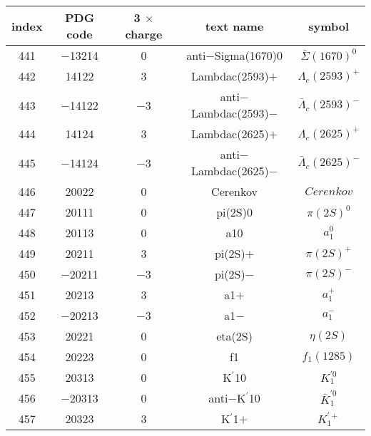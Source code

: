\documentclass{article}
\begin{document}
\begin{table}[!htbp]
\centering
\begin{tabular}{|c|c|c|c|c|}
\hline
index & PDG code & 3 $\times$ charge & text name & symbol \\
\hline
441 & $-$13214 & 0 & anti$-$Sigma(1670)0 & $\bar{\Sigma}(1670)^{0}$ \\
\hline
442 & 14122 & 3 & Lambda\underline{\hspace{0.6em}}c(2593)$+$ & $\Lambda_{c}(2593)^{+}$ \\
\hline
443 & $-$14122 & $-$3 & anti$-$Lambda\underline{\hspace{0.6em}}c(2593)$-$ & $\bar{\Lambda}_{c}(2593)^{-}$ \\
\hline
444 & 14124 & 3 & Lambda\underline{\hspace{0.6em}}c(2625)$+$ & $\Lambda_{c}(2625)^{+}$ \\
\hline
445 & $-$14124 & $-$3 & anti$-$Lambda\underline{\hspace{0.6em}}c(2625)$-$ & $\bar{\Lambda}_{c}(2625)^{-}$ \\
\hline
446 & 20022 & 0 & Cerenkov & $Cerenkov$ \\
\hline
447 & 20111 & 0 & pi(2S)0 & $\pi(2S)^{0}$ \\
\hline
448 & 20113 & 0 & a\underline{\hspace{0.6em}}10 & $a_{1}^{0}$ \\
\hline
449 & 20211 & 3 & pi(2S)$+$ & $\pi(2S)^{+}$ \\
\hline
450 & $-$20211 & $-$3 & pi(2S)$-$ & $\pi(2S)^{-}$ \\
\hline
451 & 20213 & 3 & a\underline{\hspace{0.6em}}1$+$ & $a_{1}^{+}$ \\
\hline
452 & $-$20213 & $-$3 & a\underline{\hspace{0.6em}}1$-$ & $a_{1}^{-}$ \\
\hline
453 & 20221 & 0 & eta(2S) & $\eta(2S)$ \\
\hline
454 & 20223 & 0 & f\underline{\hspace{0.6em}}1 & $f_{1}(1285)$ \\
\hline
455 & 20313 & 0 & K$^{\prime}$\underline{\hspace{0.6em}}10 & $K_1^{'0}$ \\
\hline
456 & $-$20313 & 0 & anti$-$K$^{\prime}$\underline{\hspace{0.6em}}10 & $\bar{K}_1^{'0}$ \\
\hline
457 & 20323 & 3 & K$^{\prime}$\underline{\hspace{0.6em}}1$+$ & $K_1^{'+}$ \\

\end{tabular}
\end{table}
\end{document}
